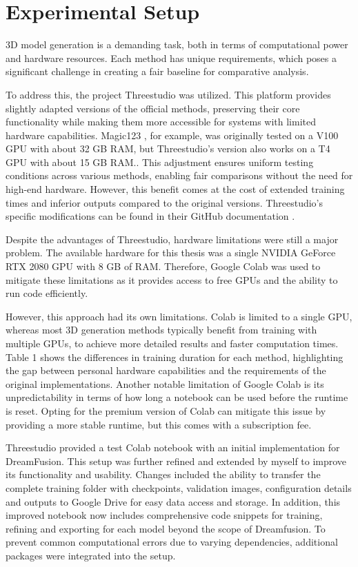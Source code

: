 \section{Experimental Setup}\label{Setup}

3D model generation is a demanding task, both in terms of computational power and hardware resources. Each method has unique requirements, which poses a significant challenge in creating a fair baseline for comparative analysis.

To address this, the project Threestudio \citep{threestudio2023} was utilized. This platform provides slightly adapted versions of the official methods, preserving their core functionality while making them more accessible for systems with limited hardware capabilities. Magic123 \citep{qian2023magic123}, for example, was originally tested on a V100 GPU with about 32 GB RAM, but Threestudio's version also works on a T4 GPU with about 15 GB RAM.\@. This adjustment ensures uniform testing conditions across various methods, enabling fair comparisons without the need for high-end hardware. However, this benefit comes at the cost of extended training times and inferior outputs compared to the original versions. Threestudio's specific modifications can be found in their GitHub documentation \citep{threestudio2023}.

Despite the advantages of Threestudio, hardware limitations were still a major problem. The available hardware for this thesis was a single NVIDIA GeForce RTX 2080 GPU with 8 GB of RAM\@. Therefore, Google Colab \citep{googlecolab} was used to mitigate these limitations as it provides access to free GPUs and the ability to run code efficiently.

However, this approach had its own limitations. Colab is limited to a single GPU, whereas most 3D generation methods typically benefit from training with multiple GPUs, to achieve more detailed results and faster computation times. Table 1 shows the differences in training duration for each method, highlighting the gap between personal hardware capabilities and the requirements of the original implementations. Another notable limitation of Google Colab is its unpredictability in terms of how long a notebook can be used before the runtime is reset. Opting for the premium version of Colab can mitigate this issue by providing a more stable runtime, but this comes with a subscription fee.

Threestudio provided a test Colab notebook with an initial implementation for DreamFusion. This setup was further refined and extended by myself to improve its functionality and usability. Changes included the ability to transfer the complete training folder with checkpoints, validation images, configuration details and outputs to Google Drive for easy data access and storage. In addition, this improved notebook now includes comprehensive code snippets for training, refining and exporting for each model beyond the scope of Dreamfusion. To prevent common computational errors due to varying dependencies, additional packages were integrated into the setup.

